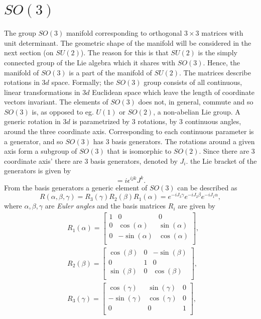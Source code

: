 \section{$SO(3)$}
The group $SO(3)$ manifold corresponding to orthogonal $3\times 3$ matrices with unit determinant. The geometric shape of the manifold will be considered in the next section (on $SU(2)$). The reason for this is that $SU(2)$ is the simply connected group of the Lie algebra which it shares with $SO(3)$. Hence, the manifold of $SO(3)$ is a part of the manifold of $SU(2)$.\newline
The matrices describe rotations in $3d$ space. Formally; the $SO(3)$ group consists of all continuous, linear transformations in $3d$ Euclidean space which leave the length of coordinate vectors invariant. The elements of $SO(3)$ does not, in general, commute and so $SO(3)$ is, as opposed to eg. $U(1)$ or $SO(2)$, a non-abelian Lie group.\newline
A generic rotation in $3d$ is parametrized by $3$ rotations, by $3$ continuous angles, around the three coordinate axis. Corresponding to each continuous parameter is a generator, and so $SO(3)$ has $3$ basis generators. The rotations around a given axis form a subgroup of $SO(3)$ that is isomorphic to $SO(2)$. Since there are $3$ coordinate axis' there are $3$ basis generators, denoted by $J_i$. the Lie bracket of the generators is given by
\begin{equation}
	[J^i,J^j]=i\epsilon^{ijk}J^k.
\end{equation} 
From the basis generators a generic element of $SO(3)$ can be described as
\begin{equation}
	R(\alpha,\beta,\gamma)=R_3(\gamma)R_2(\beta)R_1(\alpha)=e^{-iJ_3\gamma}e^{-iJ_2\beta}e^{-iJ_1\alpha},
\end{equation} 
where $\alpha,\beta,\gamma$ are \emph{Euler angles} and the basis matrices $R_i$ are given by
\begin{equation}
	\begin{split}
		&R_1(\alpha)=\begin{bmatrix}
			1 & 0 & 0 \\
			0 & \cos(\alpha) & \sin(\alpha)\\
			0 & -\sin(\alpha) & \cos(\alpha)\\
		\end{bmatrix},\\
		& 
		R_2(\beta)=\begin{bmatrix}
			\cos(\beta) & 0 & -\sin(\beta) \\
			0 & 1 & 0\\
			\sin(\beta) & 0 & \cos(\beta)\\
		\end{bmatrix},\\
		& 
		R_3(\gamma)=\begin{bmatrix}
			\cos(\gamma) & \sin(\gamma) & 0 \\
			-\sin(\gamma) & \cos(\gamma) & 0\\
			0 & 0 & 1\\
		\end{bmatrix},
	\end{split}
	\label{rot}
\end{equation} 
